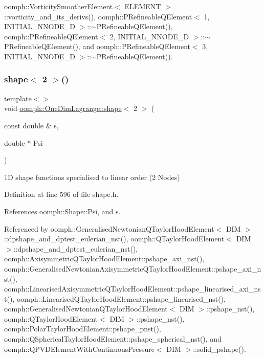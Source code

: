 oomph\+::\+Vorticity\+Smoother\+Element$<$ E\+L\+E\+M\+E\+N\+T $>$\+::vorticity\+\_\+and\+\_\+its\+\_\+derivs(), oomph\+::\+P\+Refineable\+Q\+Element$<$ 1, I\+N\+I\+T\+I\+A\+L\+\_\+\+N\+N\+O\+D\+E\+\_\+D $>$\+::$\sim$\+P\+Refineable\+Q\+Element(), oomph\+::\+P\+Refineable\+Q\+Element$<$ 2, I\+N\+I\+T\+I\+A\+L\+\_\+\+N\+N\+O\+D\+E\+\_\+D $>$\+::$\sim$\+P\+Refineable\+Q\+Element(), and oomph\+::\+P\+Refineable\+Q\+Element$<$ 3, I\+N\+I\+T\+I\+A\+L\+\_\+\+N\+N\+O\+D\+E\+\_\+D $>$\+::$\sim$\+P\+Refineable\+Q\+Element().

\mbox{\label{namespaceoomph_1_1OneDimLagrange_aec7f5263cb672ddfef50bdd3462ada19}} 
\subsubsection{\texorpdfstring{shape$<$ 2 $>$()}{shape< 2 >()}}
{\footnotesize\ttfamily template$<$$>$ \\
void \hyperlink{namespaceoomph_1_1OneDimLagrange_a117f8b892dc89989ecdad99ff261e120}{oomph\+::\+One\+Dim\+Lagrange\+::shape}$<$ 2 $>$ (\begin{DoxyParamCaption}\item[{const double \&}]{s,  }\item[{double $\ast$}]{Psi }\end{DoxyParamCaption})\hspace{0.3cm}{\ttfamily [inline]}}



1D shape functions specialised to linear order (2 Nodes) 



Definition at line 596 of file shape.\+h.



References oomph\+::\+Shape\+::\+Psi, and s.



Referenced by oomph\+::\+Generalised\+Newtonian\+Q\+Taylor\+Hood\+Element$<$ D\+I\+M $>$\+::dpshape\+\_\+and\+\_\+dptest\+\_\+eulerian\+\_\+nst(), oomph\+::\+Q\+Taylor\+Hood\+Element$<$ D\+I\+M $>$\+::dpshape\+\_\+and\+\_\+dptest\+\_\+eulerian\+\_\+nst(), oomph\+::\+Axisymmetric\+Q\+Taylor\+Hood\+Element\+::pshape\+\_\+axi\+\_\+nst(), oomph\+::\+Generalised\+Newtonian\+Axisymmetric\+Q\+Taylor\+Hood\+Element\+::pshape\+\_\+axi\+\_\+nst(), oomph\+::\+Linearised\+Axisymmetric\+Q\+Taylor\+Hood\+Element\+::pshape\+\_\+linearised\+\_\+axi\+\_\+nst(), oomph\+::\+Linearised\+Q\+Taylor\+Hood\+Element\+::pshape\+\_\+linearised\+\_\+nst(), oomph\+::\+Generalised\+Newtonian\+Q\+Taylor\+Hood\+Element$<$ D\+I\+M $>$\+::pshape\+\_\+nst(), oomph\+::\+Q\+Taylor\+Hood\+Element$<$ D\+I\+M $>$\+::pshape\+\_\+nst(), oomph\+::\+Polar\+Taylor\+Hood\+Element\+::pshape\+\_\+pnst(), oomph\+::\+Q\+Spherical\+Taylor\+Hood\+Element\+::pshape\+\_\+spherical\+\_\+nst(), and oomph\+::\+Q\+P\+V\+D\+Element\+With\+Continuous\+Pressure$<$ D\+I\+M $>$\+::solid\+\_\+pshape().

